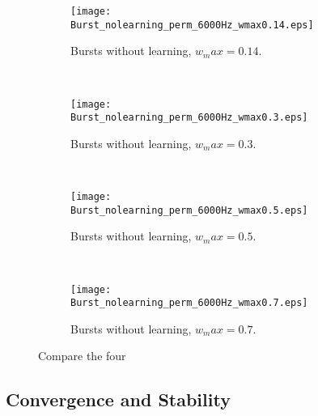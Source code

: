 \begin{figure}[H]
\centering
\begin{subfigure}[b]{0.49\textwidth}
\texttt{[image: Burst\_nolearning\_perm\_6000Hz\_wmax0.14.eps]}
\label{Burst_no_learning: 0.14}
\caption{Bursts without learning, \(w_max = 0.14\).}
\end{subfigure}
\,
\begin{subfigure}[b]{0.49\textwidth}
\texttt{[image: Burst\_nolearning\_perm\_6000Hz\_wmax0.3.eps]}
\label{Burst_no_learning: 0.3}
\caption{Bursts without learning, \(w_max = 0.3\).}
\end{subfigure}
\\
\begin{subfigure}[b]{0.49\textwidth}
\texttt{[image: Burst\_nolearning\_perm\_6000Hz\_wmax0.5.eps]}
\label{Burst_no_learning: 0.5}
\caption{Bursts without learning, \(w_max = 0.5\).}
\end{subfigure}
\,
\begin{subfigure}[b]{0.49\textwidth}
\texttt{[image: Burst\_nolearning\_perm\_6000Hz\_wmax0.7.eps]}
\label{Burst_no_learning: 0.7}
\caption{Bursts without learning, \(w_max = 0.7\).}
\end{subfigure}
\label{Burst_no_learning}
\caption{Compare the four}
\end{figure}


\subsection{Convergence and Stability}

